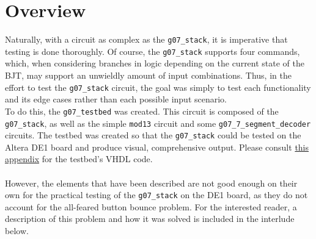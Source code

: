 \documentclass[12pt]{report}
\begin{document}
\chapter*{Overview}
Naturally, with a circuit as complex as the \texttt{g07\_stack}, it is imperative that testing is
done thoroughly. Of course, the \texttt{g07\_stack} supports four commands, which, when considering
branches in logic depending on the current state of the BJT, may support an unwieldly amount of
input combinations. Thus, in the effort to test the \texttt{g07\_stack} circuit, the goal was simply
to test each functionality and its edge cases rather than each possible input scenario.\\
To do this, the \texttt{g07\_testbed} was created. This circuit is composed of the
\texttt{g07\_stack}, as well as the simple \texttt{mod13} circuit and some
\texttt{g07\_7\_segment\_decoder} circuits. The testbed was created so that the \texttt{g07\_stack}
could be tested on the Altera DE1 board and produce visual, comprehensive output. Please consult
\hyperref[app:testbedvhdl]{this appendix} for the testbed's VHDL code.\\\\
However, the elements that have been described are not good enough on their own for the practical
testing of the \texttt{g07\_stack} on the DE1 board, as they do not account for the all-feared
button bounce problem. For the interested reader, a description of this problem and how it was
solved is included in the interlude below.
\end{document}
